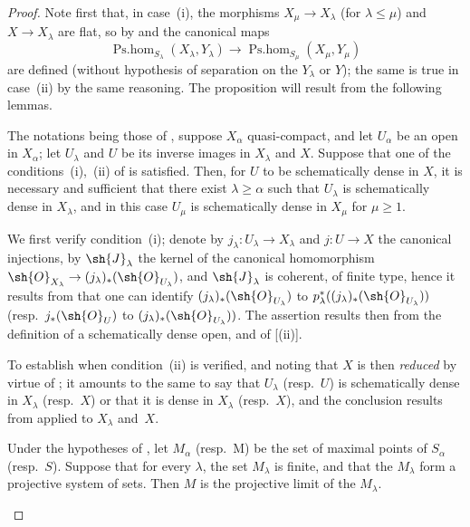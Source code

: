 \begin{proof}
Note first that, in case~(i), the morphisms $X_\mu\to X_\lambda$ (for $\lambda\leq\mu$) and $X\to X_\lambda$ are flat, so by  and  the canonical maps
\[
  \operatorname{Ps.hom}_{S_\lambda}(X_\lambda,Y_\lambda)\to\operatorname{Ps.hom}_{S_\mu}(X_\mu,Y_\mu)
\]
are defined (without hypothesis of separation on the $Y_\lambda$ or $Y$);
the same is true in case~(ii) by the same reasoning.
The proposition will result from the following lemmas.

\begin{lemma}[20.3.8.2]
\label{IV.20.3.8.2}
The notations being those of , suppose $X_\alpha$ quasi-compact, and let $U_\alpha$ be an open in $X_\alpha$;
let $U_\lambda$ and $U$ be its inverse images in $X_\lambda$ and $X$.
Suppose that one of the conditions~(i),~(ii) of  is satisfied.
Then, for $U$ to be schematically dense in $X$, it is necessary and sufficient that there exist $\lambda\geq\alpha$ such that $U_\lambda$ is schematically dense in $X_\lambda$, and in this case $U_\mu$ is schematically dense in $X_\mu$ for $\mu\geq 1$.
\end{lemma}

We first verify condition~(i);
denote by $j_\lambda:U_\lambda\to X_\lambda$ and $j:U\to X$ the canonical injections, by $\sh{J}_\lambda$ the kernel of the canonical homomorphism $\sh{O}_{X_\lambda}\to(j_\lambda)_*(\sh{O}_{U_\lambda})$, and $\sh{J}_\lambda$ is coherent, of finite type, hence it results from  that one can identify $(j_\lambda)_*(\sh{O}_{U_\lambda})$ to $p^*_\lambda((j_\lambda)_*(\sh{O}_{U_\lambda}))$ (resp.\ $j_*(\sh{O}_U)$ to $(j_\lambda)_*(\sh{O}_{U_\lambda}))$.
The assertion results then from the definition of a schematically dense open, and of [(ii)].

To establish  when condition~(ii) is verified, and noting that $X$ is then \emph{reduced} by virtue of ;
it amounts to the same to say that $U_\lambda$ (resp.\ $U$) is schematically dense in $X_\lambda$ (resp.\ $X$) or that it is dense in $X_\lambda$ (resp.\ $X$), and the conclusion results from  applied to $X_\lambda$ and~$X$.

\begin{lemma}[20.3.8.3]
\label{IV.20.3.8.3}
Under the hypotheses of , let $M_\alpha$ (resp.\ M) be the set of maximal points of $S_\alpha$ (resp.\ $S$).
Suppose that for every $\lambda$, the set $M_\lambda$ is finite, and that the $M_\lambda$ form a projective system of sets.
Then $M$ is the projective limit of the $M_\lambda$.
\end{lemma}


\end{proof}
